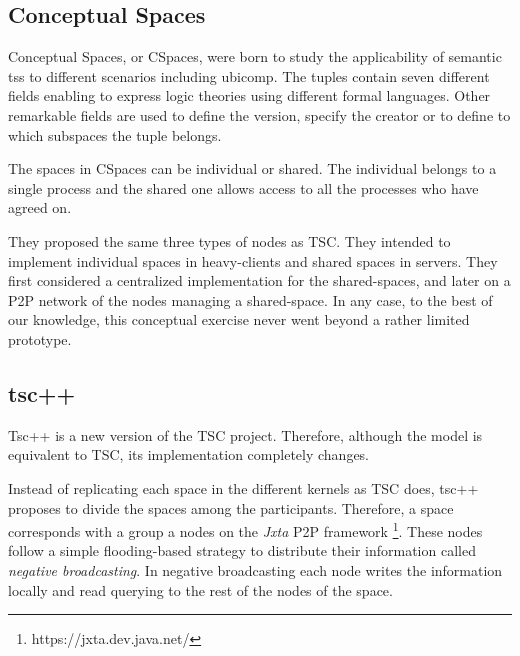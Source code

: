 \subsection{Conceptual Spaces}

Conceptual Spaces, or CSpaces, were born to study the applicability of semantic \aclp{ts} to different scenarios including \acl{ubicomp}.
The tuples contain seven different fields enabling to express logic theories using different formal languages.
Other remarkable fields are used to define the version, specify the creator or to define to which subspaces the tuple belongs. %

The spaces in CSpaces can be individual or shared.
The individual belongs to a single process and the shared one allows access to all the processes who have agreed on.

They proposed the same three types of nodes as TSC.
They intended to implement individual spaces in heavy-clients and shared spaces in servers.
They first considered a centralized implementation for the shared-spaces, %
and later on a P2P network of the nodes managing a shared-space. %
In any case, to the best of our knowledge, this conceptual exercise never went beyond a rather limited prototype.



\subsection{tsc++}

Tsc++ \cite{krummenacher_open_2009} is a new version of the TSC project.
Therefore, although the model is equivalent to TSC, its implementation completely changes.


Instead of replicating each space in the different kernels as TSC does, tsc++ proposes to divide the spaces among the participants.
Therefore, a space corresponds with a group a nodes on the \emph{Jxta} P2P framework \footnote{https://jxta.dev.java.net/}. %
These nodes follow a simple flooding-based strategy to distribute their information called \emph{negative broadcasting}.
In negative broadcasting each node writes the information locally and read querying to the rest of the nodes of the space.


